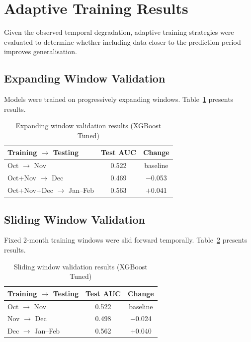 \documentclass{report}
\begin{document}
\section{Adaptive Training Results}
\label{sec:adaptive}

Given the observed temporal degradation, adaptive training strategies were
evaluated to determine whether including data closer to the prediction period
improves generalisation.

\subsection{Expanding Window Validation}

Models were trained on progressively expanding windows.
Table~\ref{tab:expand_window} presents results.

\begin{table}[H]
\centering
\caption{Expanding window validation results (XGBoost Tuned)}
\label{tab:expand_window}
\begin{tabular}{lcc}
\toprule
\textbf{Training $\to$ Testing} & \textbf{Test AUC} &
  \textbf{Change} \\
\midrule
Oct $\to$ Nov               & 0.522 & baseline \\
Oct+Nov $\to$ Dec           & 0.469 & $-$0.053 \\
Oct+Nov+Dec $\to$ Jan--Feb  & 0.563 & $+$0.041 \\
\bottomrule
\end{tabular}
\end{table}

\subsection{Sliding Window Validation}

Fixed 2-month training windows were slid forward temporally.
Table~\ref{tab:slide_window} presents results.

\begin{table}[H]
\centering
\caption{Sliding window validation results (XGBoost Tuned)}
\label{tab:slide_window}
\begin{tabular}{lcc}
\toprule
\textbf{Training $\to$ Testing} & \textbf{Test AUC} &
  \textbf{Change} \\
\midrule
Oct $\to$ Nov         & 0.522 & baseline \\
Nov $\to$ Dec         & 0.498 & $-$0.024 \\
Dec $\to$ Jan--Feb    & 0.562 & $+$0.040 \\
\bottomrule
\end{tabular}
\end{table}
\end{document}
